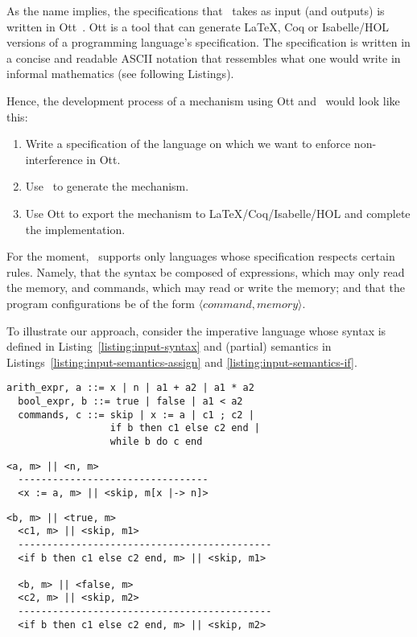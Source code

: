 \documentclass[sigplan,10pt]{acmart}\settopmatter{printfolios=true,printccs=false,printacmref=false}
\begin{document}
As the name implies, the specifications that \ottifc\ takes as input (and outputs) is written in Ott~\cite{DBLP:journals/jfp/SewellNOPRSS10}. Ott is a tool that can generate LaTeX, Coq or Isabelle/HOL versions of a programming language's specification. The specification is written in a concise and readable ASCII notation that ressembles what one would write in informal mathematics (see following Listings).

Hence, the development process of a mechanism using Ott and \ottifc\ would look like this:
\begin{enumerate}
  \item Write a specification of the language on which we want to enforce non-interference in Ott.
  \item Use \ottifc\ to generate the mechanism.
  \item Use Ott to export the mechanism to LaTeX/Coq/Isabelle/HOL and complete the implementation.
\end{enumerate}

For the moment, \ottifc\ supports only languages whose specification respects certain  rules. Namely, that the syntax be composed of expressions, which may only read the memory, and commands, which may read or write the memory; and that the program configurations be of the form $\langle command, memory\rangle$. 

To illustrate our approach, consider the imperative language whose syntax is defined in Listing~\ref{listing:input-syntax} and (partial) semantics in Listings~\ref{listing:input-semantics-assign} and \ref{listing:input-semantics-if}.
\newpage
\begin{lstlisting}[label=listing:input-syntax,captionpos=b,caption=Ott syntax of a simple imperative language]
  arith_expr, a ::= x | n | a1 + a2 | a1 * a2 
  bool_expr, b ::= true | false | a1 < a2
  commands, c ::= skip | x := a | c1 ; c2 | 
                  if b then c1 else c2 end | 
                  while b do c end   
\end{lstlisting}

\begin{lstlisting}[label=listing:input-semantics-assign,captionpos=b,caption={Ott big-step semantics of the assign command}]
  <a, m> || <n, m>
  ---------------------------------
  <x := a, m> || <skip, m[x |-> n]>
\end{lstlisting}

\begin{lstlisting}[label=listing:input-semantics-if, captionpos=b,caption={Ott big-step semantics of the if command}]
  <b, m> || <true, m>
  <c1, m> || <skip, m1>
  --------------------------------------------
  <if b then c1 else c2 end, m> || <skip, m1>

  <b, m> || <false, m>
  <c2, m> || <skip, m2>
  --------------------------------------------
  <if b then c1 else c2 end, m> || <skip, m2>
\end{lstlisting}
\end{document}
